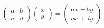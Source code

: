 \documentclass[preview]{standalone}
\begin{document}
\begin{align*}
\begin{pmatrix} a & b \\ c & d \end{pmatrix} \begin{pmatrix} x \\ y \end{pmatrix} = \begin{pmatrix} a x + b y \\ c x + d y \end{pmatrix}
\end{align*}
\end{document}
